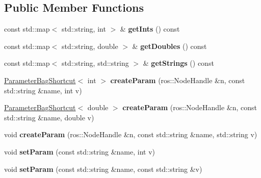 \subsection*{Public Member Functions}
\begin{DoxyCompactItemize}
\item 
\hypertarget{classParameterBag_aa441186069d8890e7ecd94bc323b029d}{
const std::map$<$ std::string, int $>$ \& {\bfseries getInts} () const }
\label{classParameterBag_aa441186069d8890e7ecd94bc323b029d}

\item 
\hypertarget{classParameterBag_ab13e8fbb42358e4dc2f72456e0475ffa}{
const std::map$<$ std::string, double $>$ \& {\bfseries getDoubles} () const }
\label{classParameterBag_ab13e8fbb42358e4dc2f72456e0475ffa}

\item 
\hypertarget{classParameterBag_a96eab8894314fbced498b8a9025bdb59}{
const std::map$<$ std::string, std::string $>$ \& {\bfseries getStrings} () const }
\label{classParameterBag_a96eab8894314fbced498b8a9025bdb59}

\item 
\hypertarget{classParameterBag_ad3f0af8e03332d8ff072c2b087f447f0}{
\hyperlink{structParameterBag_1_1ParameterBagShortcut}{ParameterBagShortcut}$<$ int $>$ {\bfseries createParam} (ros::NodeHandle \&n, const std::string \&name, int v)}
\label{classParameterBag_ad3f0af8e03332d8ff072c2b087f447f0}

\item 
\hypertarget{classParameterBag_a6234beff97e34bae792f560dc5199700}{
\hyperlink{structParameterBag_1_1ParameterBagShortcut}{ParameterBagShortcut}$<$ double $>$ {\bfseries createParam} (ros::NodeHandle \&n, const std::string \&name, double v)}
\label{classParameterBag_a6234beff97e34bae792f560dc5199700}

\item 
\hypertarget{classParameterBag_aaf837b9c32c883471acd38825c8b415a}{
void {\bfseries createParam} (ros::NodeHandle \&n, const std::string \&name, std::string v)}
\label{classParameterBag_aaf837b9c32c883471acd38825c8b415a}

\item 
\hypertarget{classParameterBag_abd3c8663bf3b04bbb0f3978a87b31a2b}{
void {\bfseries setParam} (const std::string \&name, int v)}
\label{classParameterBag_abd3c8663bf3b04bbb0f3978a87b31a2b}

\item 
\hypertarget{classParameterBag_ab1157303d340f800f24245b1ec369b8b}{
void {\bfseries setParam} (const std::string \&name, const std::string \&v)}
\label{classParameterBag_ab1157303d340f800f24245b1ec369b8b}


\end{DoxyCompactItemize}
